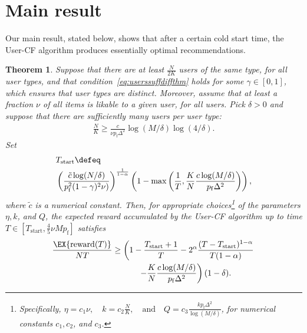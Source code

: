 \documentclass{article}
\newcommand\arewardT{\EX{\mathrm{reward}(T)}}
\newtheorem{theorem}{Theorem}
\newcommand\pf{p_{\mathrm{f}}}
\newcommand\nitem{M}
\begin{document}
\vspace{-0.2cm}
\section{\label{sec:mainres}Main result}
\vspace{-0.2cm}

Our main result, stated below, 
shows that %
after a certain cold start time, the User-CF algorithm produces essentially optimal recommendations. 

\begin{theorem}
\label{thm:mainspecial}
Suppose that there are at least $\frac{N}{2K}$ users of the same type, for all user types, 
and that condition~\eqref{eq:userssuffdiffthm} holds for some $\gamma \in [0,1]$, which ensures that user types are distinct. 
Moreover, assume that at least a fraction $\nu$ of all items is likable to a given user, for all users. 
Pick $\delta >0$ and suppose that there are sufficiently many users per user type:
\begin{align}
\label{eq:kappacond}
\frac{N}{K} \geq \frac{c}{\nu \pf \Delta^2} \log(M/\delta) \log(4/\delta).
\end{align}
Set \begin{align*}
&T_{\text{start}} \defeq \\
&\left(
\frac{\tilde c \log(N/\delta) 
}{
\pf^2  (1 - \gamma)^2 \nu) 
} 
\right)^{\frac{1}{1-\alpha}} 
\left(1 - \max\left( \frac{1}{T} , \frac{K}{N} \frac{c \log(M/\delta)}{ \pf \Delta^2} \right) \right),
\end{align*}
where $\tilde c$ is a numerical constant. 
Then, for appropriate choices\footnote{Specifically, $\eta = c_1 \nu, 
\quad
k = c_2 \frac{N}{K},
\quad 
\text{and}
\quad 
Q = c_3  
\frac{k \pf \Delta^2 }{\log( M / \delta)}$, for numerical constants $c_1,c_2$, and $c_3$.
}
of the parameters $\eta,k$, and $Q$, 
the expected reward accumulated by the 
User-CF algorithm up to time $T \in [T_{\text{start}} , \frac{4}{5} \nu \nitem \pf]$ satisfies
\begin{align}
\frac{\arewardT}{NT}  &\geq \left( 1 - \frac{T_{\text{start}} + 1}{T} 
-  2^\alpha \frac{ (T - T_{\text{start}})^{1-\alpha} }{T(1-\alpha)} \right. \nonumber \\
&\hspace{1.1cm}\left.- \frac{K}{N} \frac{c \log(M/\delta)}{ \pf \Delta^2} \right) (1-\delta). 
\label{eq:lbonregretorig}
\end{align}
\end{theorem}
\end{document}
